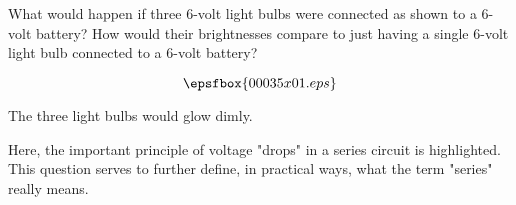 

What would happen if three 6-volt light bulbs were connected as shown to a 6-volt battery?  How would their brightnesses compare to just having a single 6-volt light bulb connected to a 6-volt battery?

$$\epsfbox{00035x01.eps}$$







The three light bulbs would glow dimly.







Here, the important principle of voltage "drops" in a series circuit is highlighted.  This question serves to further define, in practical ways, what the term "series" really means.




